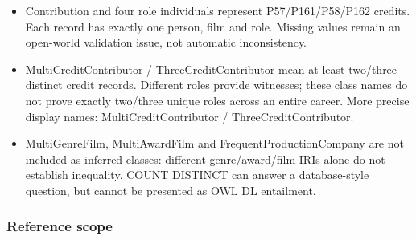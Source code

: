 \documentclass[
  11pt,
]{article}
\begin{document}
\begin{itemize}
  guessed.
\item
  Contribution and four role individuals represent
  P57/\allowbreak{}\allowbreak{}P161\allowbreak{}/\allowbreak{}\allowbreak{}P58/\allowbreak{}\allowbreak{}P16\allowbreak{}2
  credits. Each record has exactly one person, film and role. Missing
  values remain an open-world validation issue, not automatic
  inconsis\allowbreak{}tency.\allowbreak{}
\item
  Multi\allowbreak{}Cre\allowbreak{}dit\allowbreak{}Contr\allowbreak{}ibutor
  /
  Three\allowbreak{}Cre\allowbreak{}dit\allowbreak{}Contr\allowbreak{}ibutor
  mean at least two/three distinct credit records. Different roles
  provide witnesses; these class names do not prove exactly two/three
  unique roles across an entire career. More precise display names:
  Multi\allowbreak{}Cre\allowbreak{}dit\allowbreak{}Contr\allowbreak{}ibutor
  /
  Three\allowbreak{}Cre\allowbreak{}dit\allowbreak{}Contr\allowbreak{}ibutor.\allowbreak{}
\item
  Multi\allowbreak{}Gen\allowbreak{}re\allowbreak{}Film,
  Multi\allowbreak{}Awa\allowbreak{}rd\allowbreak{}Film and
  Frequent\allowbreak{}\allowbreak{}Producti\allowbreak{}on\allowbreak{}Compan\allowbreak{}y
  are not included as inferred classes: different
  genre/\allowbreak{}aw\allowbreak{}ard/\allowbreak{}film\allowbreak{}
  IRIs alone do not establish inequality. COUNT DISTINCT can answer a
  database\allowbreak{}-\allowbreak{}style question, but cannot be
  presented as OWL DL entailment.
\end{itemize}

\subsubsection{Reference scope}\label{reference-scope}
\end{document}
